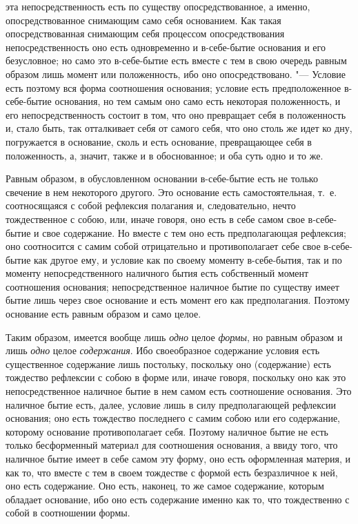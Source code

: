 эта непосредственность есть по существу опосредствованное, а именно,
опосредствованное снимающим само себя основанием. Как такая
опосредствованная снимающим себя процессом опосредствования
непосредственность оно есть одновременно и в-себе-бытие основания и его
безусловное; но само это в-себе-бытие есть вместе с тем в свою очередь
равным образом лишь момент или положенность, ибо оно опосредствовано. "---
Условие есть поэтому вся форма соотношения основания; условие есть
предположенное в-себе-бытие основания, но тем самым оно само есть некоторая
положенность, и его непосредственность состоит в том, что оно превращает
себя в положенность и, стало быть, так отталкивает себя от самого себя, что
оно столь же идет ко дну, погружается в основание, сколь и есть основание,
превращающее себя в положенность, а, значит, также и в обоснованное; и оба
суть одно и то же.

Равным образом, в обусловленном основании в-себе-бытие есть не только
свечение в нем некоторого другого. Это основание есть самостоятельная,
т.~е. соотносящаяся с собой рефлексия полагания и, следовательно, нечто
тождественное с собою, или, иначе говоря, оно есть в себе самом свое
в-себе-бытие и свое содержание. Но вместе с тем оно есть предполагающая
рефлексия; оно соотносится с самим собой отрицательно и противополагает
себе свое в-себе-бытие как другое ему, и условие как по своему моменту
в-себе-бытия, так и по моменту непосредственного наличного бытия есть
собственный момент соотношения основания; непосредственное наличное бытие
по существу имеет бытие лишь через свое основание и есть момент его как
предполагания. Поэтому основание есть равным образом и само целое.

Таким образом, имеется вообще лишь {\em одно} целое
{\em формы}, но равным образом и лишь
{\em одно} целое {\em содержания}.
Ибо своеобразное содержание условия есть существенное содержание лишь
постольку, поскольку оно (содержание) есть тождество рефлексии с собою в
форме или, иначе говоря, поскольку оно как это непосредственное наличное
бытие в нем самом есть соотношение основания. Это наличное бытие есть,
далее, условие лишь в силу предполагающей рефлексии основания; оно есть
тождество последнего с самим собою или его содержание, которому основание
противополагает себя. Поэтому наличное бытие не есть только бесформенный
материал для соотношения основания, а ввиду того, что наличное бытие имеет
в себе самом эту форму, оно есть оформленная материя, и как то, что вместе
с тем в своем тождестве с формой есть безразличное к ней, оно есть
содержание. Оно есть, наконец, то же самое содержание, которым обладает
основание, ибо оно есть содержание именно как то, что тождественно с собой
в соотношении формы.

